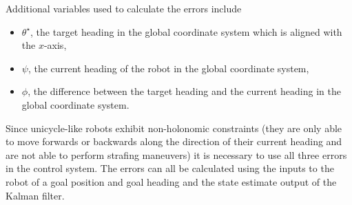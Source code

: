 Additional variables used to calculate the errors include
\begin{itemize}
\item $\theta^\star$, the target heading in the global coordinate system which is aligned with the $x$-axis,
\item $\psi$, the current heading of the robot in the global coordinate system,
\item $\phi$, the difference between the target heading and the current heading in the global coordinate system.
\end{itemize}

Since unicycle-like robots exhibit non-holonomic constraints (they are only able to move forwards or backwards along the direction of their current heading and are not able to perform strafing maneuvers) it is necessary to use all three errors in the control system. The errors can all be calculated using the inputs to the robot of a goal position and goal heading and the state estimate output of the Kalman filter.


